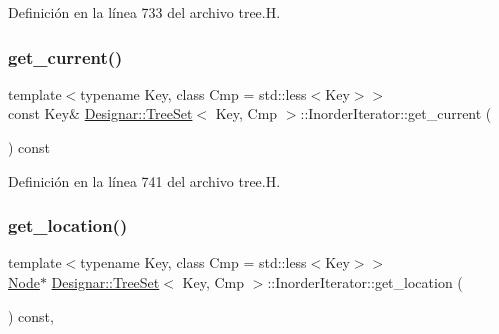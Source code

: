 Definición en la línea 733 del archivo tree.\+H.

\mbox{\label{class_designar_1_1_tree_set_1_1_inorder_iterator_aad3ec85d58308071d6589fdbb258bdf6}} 
\subsubsection{\texorpdfstring{get\+\_\+current()}{get\_current()}\hspace{0.1cm}{\footnotesize\ttfamily [2/2]}}
{\footnotesize\ttfamily template$<$typename Key, class Cmp = std\+::less$<$\+Key$>$$>$ \\
const Key\& \hyperlink{class_designar_1_1_tree_set}{Designar\+::\+Tree\+Set}$<$ Key, Cmp $>$\+::Inorder\+Iterator\+::get\+\_\+current (\begin{DoxyParamCaption}{ }\end{DoxyParamCaption}) const\hspace{0.3cm}{\ttfamily [inline]}}



Definición en la línea 741 del archivo tree.\+H.

\mbox{\label{class_designar_1_1_tree_set_1_1_inorder_iterator_a06e9a4e3d4d834c250932e3d77190b1f}} 
\subsubsection{\texorpdfstring{get\+\_\+location()}{get\_location()}}
{\footnotesize\ttfamily template$<$typename Key, class Cmp = std\+::less$<$\+Key$>$$>$ \\
\hyperlink{class_designar_1_1_tree_set_a7409a9c1545c0e9e2fd6b84120713c99}{Node}$\ast$ \hyperlink{class_designar_1_1_tree_set}{Designar\+::\+Tree\+Set}$<$ Key, Cmp $>$\+::Inorder\+Iterator\+::get\+\_\+location (\begin{DoxyParamCaption}{ }\end{DoxyParamCaption}) const\hspace{0.3cm}{\ttfamily [inline]}, {\ttfamily [protected]}}




